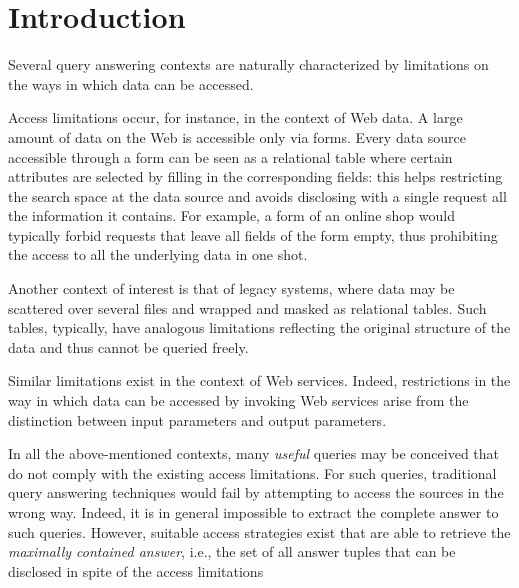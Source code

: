 \section{Introduction}
\label{sec:intro}


Several query answering contexts are naturally characterized by limitations on the ways in which data can be accessed.


Access limitations occur, for instance, in the context of Web data.
A large amount of data on the Web is accessible only via forms.
Every data source accessible through a form can be seen as a relational table where certain attributes are selected by filling in the corresponding fields: this helps restricting the search space at the data source and avoids disclosing with a single request all the information it contains.
For example, a form of an online shop would typically forbid requests that leave all fields of the form empty, thus prohibiting the access to all the underlying data in one shot.

Another context of interest is that of legacy systems, where data may be scattered over several files and wrapped and masked as relational tables. Such tables, typically, have analogous limitations reflecting the original structure of the data and thus cannot be queried freely.

Similar limitations exist in the context of Web services. Indeed, restrictions in the way in which data can be accessed by invoking Web services arise from the distinction between input parameters and output parameters.

In all the above-mentioned contexts, many \emph{useful} queries may be conceived that do not comply with the existing access limitations. For such queries, traditional query answering techniques would fail by attempting to access the sources in the wrong way.
Indeed, it is in general impossible to extract the complete answer to such queries.
However, suitable access strategies exist that are able to retrieve the \emph{maximally contained answer}, i.e., the set of all answer tuples that can be disclosed in spite of the access limitations

